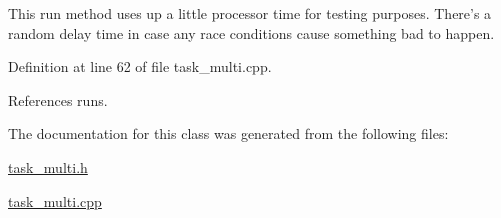 This run method uses up a little processor time for testing purposes. There's a random delay time in case any race conditions cause something bad to happen. 

Definition at line 62 of file task\+\_\+multi.\+cpp.



References runs.



The documentation for this class was generated from the following files\+:\begin{DoxyCompactItemize}
\item 
\hyperlink{task__multi_8h}{task\+\_\+multi.\+h}\item 
\hyperlink{task__multi_8cpp}{task\+\_\+multi.\+cpp}\end{DoxyCompactItemize}
